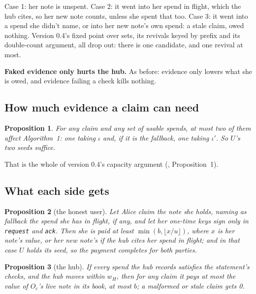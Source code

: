 \documentclass[11pt]{article}
\theoremstyle{plain}
\newtheorem{proposition}{Proposition}
\theoremstyle{definition}
\newcommand{\tx}[1]{\texttt{#1}}
\newcommand{\Oc}{O_c}
\begin{document}
Case 1: her note is unspent. Case 2: it went into her spend in flight,
which the hub cites, so her new note counts, unless she spent that too.
Case 3: it went into a spend she didn't name, or into her new note's
own spend: a stale claim, owed nothing. Version 0.4's fixed point over
sets, its revivals keyed by prefix and its double-count argument, all
drop out: there is one candidate, and one revival at most.

\textbf{Faked evidence only hurts the hub.} As before: evidence only
lowers what she is owed, and evidence failing a check kills nothing.

\subsection{How much evidence a claim can need}\label{sec:volume}

\begin{proposition}\label{prop:volume}
For any claim and any set of usable spends, at most two of them affect
Algorithm~1: one taking $\iota$ and, if it is the fallback, one taking
$\iota'$. So $U$'s two seeds suffice.
\end{proposition}

That is the whole of version 0.4's capacity argument (\cite{grants04},
Proposition~1).

\subsection{What each side gets}\label{sec:who}

\begin{proposition}[the honest user]\label{prop:user}
Let Alice claim the note she holds, naming as fallback the spend she
has in flight, if any, and let her one-time keys sign only in
\tx{request} and \tx{ack}. Then she is paid at least $\min(b, \lfloor
x/u \rfloor)$, where $x$ is her note's value, or her new note's if the
hub cites her spend in flight; and in that case $U$ holds its seed, so
the payment completes for both parties.
\end{proposition}

\begin{proposition}[the hub]\label{prop:hub}
If every spend the hub records satisfies the statement's checks, and
the hub moves within $w_H$, then for any claim it pays at most the value
of $\Oc$'s live note in its book, at most $b$; a malformed or stale claim
gets 0.
\end{proposition}
\end{document}
